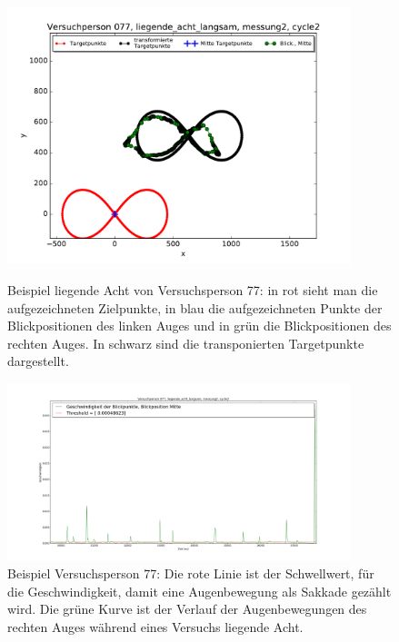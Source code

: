 \documentclass[12pt]{article}
\begin{document}
\begin{landscape}
\begin{figure}[t]
	\begin{minipage}[ht]{10cm}
	\noindent \begin{centering}	
		\includegraphics[width=10cm]{Bilder/AufzeichnungVP77.pdf}
		\par\end{centering}
	\caption{\label{fig:rohdaten}Beispiel liegende Acht von Versuchsperson 77: in rot sieht man die aufgezeichneten Zielpunkte, in blau die aufgezeichneten Punkte der Blickpositionen des linken Auges und in gr\"un die Blickpositionen des rechten Auges. In schwarz sind die transponierten Targetpunkte dargestellt.}
    \end{minipage}
	\qquad
    \begin{minipage}[ht]{10cm}	
	\noindent \begin{centering}
		\includegraphics[width=10cm]{Bilder/figure_saccade_vp_77.png}
		\par\end{centering}
	\caption{\label{fig:DiagrammSakkaden}Beispiel Versuchsperson 77: Die rote Linie ist der Schwellwert, f\"ur die Geschwindigkeit, damit eine Augenbewegung als Sakkade gez\"ahlt wird. Die gr\"une Kurve ist der Verlauf der Augenbewegungen des rechten Auges w\"ahrend eines Versuchs liegende Acht.}
    \end{minipage}
\end{figure}
\end{landscape}




\end{document}
